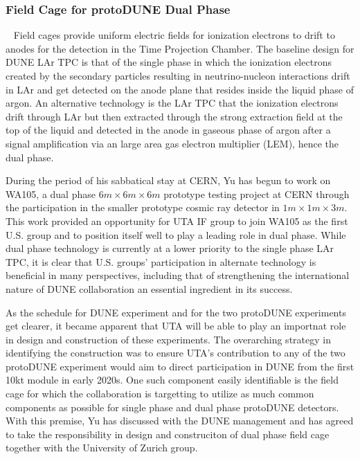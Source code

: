 \subsubsection{Field Cage for protoDUNE Dual Phase}~\label{ss:proto-dune-dp-fc}
Field cages provide uniform electric fields for ionization electrons to drift to anodes for the detection in the Time Projection Chamber.
The baseline design for DUNE LAr TPC is that of the single phase in which the ionization electrons created by the secondary particles 
resulting in neutrino-nucleon interactions drift in LAr and get detected on the anode plane that resides inside the liquid phase of argon.  An alternative technology is the LAr TPC that the ionization electrons drift through LAr but then extracted through the strong extraction field at the top of the liquid and detected in the anode in gaseous phase of argon after a signal amplification via an large area gas electron multiplier (LEM), hence the dual phase.

During the period of his sabbatical stay at CERN, Yu has begun to work on WA105, a dual phase $6m\times 6m\times 6m$ prototype testing project at CERN through the participation in the smaller prototype cosmic ray detector in $1m\times 1m\times 3m$.  This work provided an opportunity for UTA IF group to join WA105 as the first U.S. group and to position itself well to play a leading role in dual phase.   While dual phase technology is currently at a lower priority to the single phase LAr TPC, it is clear that U.S. groups' participation in alternate technology is beneficial in many perspectives, including that of strengthening the international nature of DUNE collaboration an essential ingredient in its success.

As the schedule for DUNE experiment and for the two protoDUNE experiments get clearer, it became apparent that UTA will be able to play an importnat role in design and construction of these experiments.   The overarching strategy in identifying the construction was to ensure UTA's contribution to any of the two protoDUNE experiment would aim to direct participation in DUNE from the first 10kt module in early 2020s.  One such component easily identifiable is the field cage for which the collaboration is targetting to utilize as much common components as possible for single phase and dual phase protoDUNE detectors.    With this premise, Yu has discussed with the DUNE management and has agreed to take the responsibility in design and construciton of dual phase field cage together with the University of Zurich group.    

